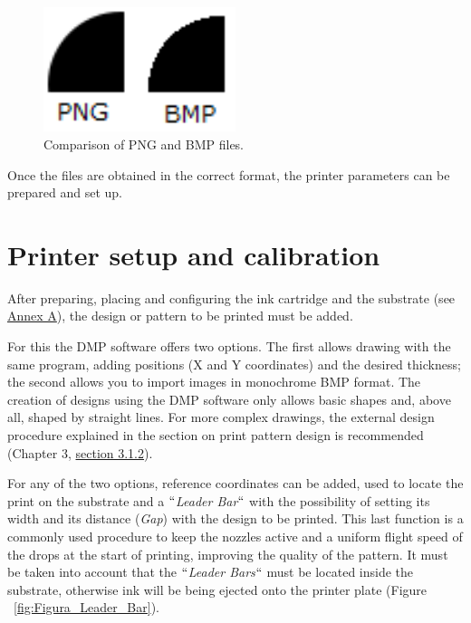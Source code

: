 \begin{figure}[H]
  \centering
    \includegraphics[width=0.5\textwidth]{Figures/Figura_comparacion_png_bmp}
  \caption{Comparison of PNG and BMP files.}
  \label{fig:Figura_comparacion_png_bmp}
\end{figure}

Once the files are obtained in the correct format, the printer parameters can be prepared and set up.

\section{Printer setup and calibration}
\label{sec:calib_impresora}
After preparing, placing and configuring the ink cartridge and the substrate (see \hyperref[chap:apendiceA]{Annex A}), the design or pattern to be printed must be added.

For this the DMP software offers two options. The first allows drawing with the same program, adding positions (X and Y coordinates) and the desired thickness; the second allows you to import images in monochrome BMP format. The creation of designs using the DMP software only allows basic shapes and, above all, shaped by straight lines. For more complex drawings, the external design procedure explained in the section on print pattern design is recommended (Chapter 3, \hyperref[subsec:diseno_impresion]{section 3.1.2}).

For any of the two options, reference coordinates can be added, used to locate the print on the substrate and a $``$\textit{Leader Bar}$``$ with the possibility of setting its width and its distance (\textit{Gap}) with the design to be printed. This last function is a commonly used procedure to keep the nozzles active and a uniform flight speed of the drops at the start of printing, improving the quality of the pattern. It must be taken into account that the $``$\textit{Leader Bars}$``$ must be located inside the substrate, otherwise ink will be being ejected onto the printer plate (Figure ~\ref{fig:Figura_Leader_Bar}).

